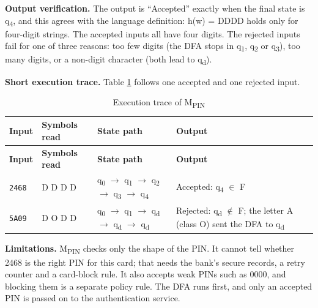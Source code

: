 \documentclass[12pt,a4paper]{article}
\begin{document}
\textbf{Output verification.} The output is ``Accepted'' exactly when the final state is q\textsubscript{4}, and this agrees with the language definition: h(w) = DDDD holds only for four-digit strings. The accepted inputs all have four digits. The rejected inputs fail for one of three reasons: too few digits (the DFA stops in q\textsubscript{1}, q\textsubscript{2} or q\textsubscript{3}), too many digits, or a non-digit character (both lead to q\textsubscript{d}).

\textbf{Short execution trace.} Table \ref{tab:pin_trace} follows one accepted and one rejected input.

{\small
\begin{longtable}{|>{\raggedright\arraybackslash}p{}|>{\raggedright\arraybackslash}p{}|>{\raggedright\arraybackslash}p{}|>{\raggedright\arraybackslash}p{}|}
\caption[Execution trace of MPIN]{Execution trace of M\textsubscript{PIN}}\label{tab:pin_trace}\\
\hline
\rowcolor{hdr}\textbf{Input} & \textbf{Symbols read} & \textbf{State path} & \textbf{Output}\\ \hline
\endfirsthead
\hline
\rowcolor{hdr}\textbf{Input} & \textbf{Symbols read} & \textbf{State path} & \textbf{Output}\\ \hline
\endhead
\texttt{2468} & D  D  D  D & q\textsubscript{0} \ensuremath{\rightarrow} q\textsubscript{1} \ensuremath{\rightarrow} q\textsubscript{2} \ensuremath{\rightarrow} q\textsubscript{3} \ensuremath{\rightarrow} q\textsubscript{4} & Accepted: q\textsubscript{4} \ensuremath{\in} F\\ \hline
\texttt{5A09} & D  O  D  D & q\textsubscript{0} \ensuremath{\rightarrow} q\textsubscript{1} \ensuremath{\rightarrow} q\textsubscript{d} \ensuremath{\rightarrow} q\textsubscript{d} \ensuremath{\rightarrow} q\textsubscript{d} & Rejected: q\textsubscript{d} \ensuremath{\notin} F; the letter A (class O) sent the DFA to q\textsubscript{d}\\ \hline
\end{longtable}}

\textbf{Limitations.} M\textsubscript{PIN} checks only the shape of the PIN. It cannot tell whether 2468 is the right PIN for this card; that needs the bank's secure records, a retry counter and a card-block rule. It also accepts weak PINs such as 0000, and blocking them is a separate policy rule. The DFA runs first, and only an accepted PIN is passed on to the authentication service.
\end{document}
